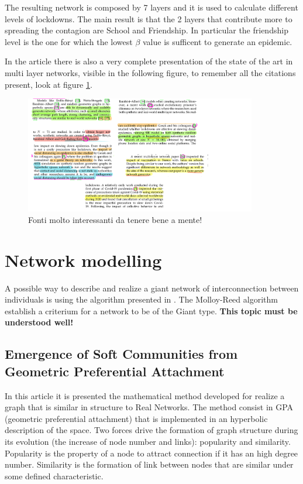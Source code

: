 \documentclass[a4paper,11pt]{scrartcl}
\begin{document}
	The resulting network is composed by 7 layers and it is used to calculate different levels of lockdowns. The main result is that the 2 layers that contribute more to spreading the contagion are School and Friendship.
	In particular the friendship level is the one for which the lowest $\beta$ value is sufficent to generate an epidemic. 
	
	In the article there is also a very complete presentation of the state of the art in multi layer networks, visible in the following figure, to remember all the citations present, look at figure \ref{fig:fonti}.
	
	\begin{figure}[H]
		\centering
		\includegraphics[width=0.9\textwidth]{images_note/fonti_da_articolo.png}
		\caption{Fonti molto interessanti da tenere bene a mente! } 
		\label{fig:fonti}
	\end{figure}
	
	
	
\section{Network modelling}  	
A possible way to describe and realize a giant network of  interconnection between individuals is using the algorithm presented in \cite{Molloy1995}. The Molloy-Reed algorithm establish a criterium for a network to be of the Giant type. \textbf{This topic must be understood well!}

\subsection{Emergence of Soft Communities from Geometric Preferential Attachment }
In this article \cite{Zuev2015}it is presented the mathematical method developed for realize a graph that is similar in structure to Real Networks.
The method consist in GPA (geometric preferential attachment) that is implemented in an hyperbolic description of the space. Two forces drive the formation of graph structure during its evolution (the increase of node number and links): popularity and similarity.
Popularity is the property of a node to attract connection if it has an high degree number. Similarity is the formation of link between nodes that are similar under some defined characteristic. 
\end{document}
